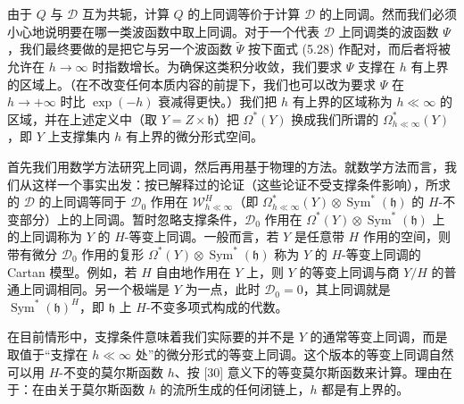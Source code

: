 \documentclass[11pt,a4paper,UTF8]{ctexart}
\theoremstyle{plain}
\theoremstyle{definition}
\begin{document}
由于 $Q$ 与 $\mathcal D$ 互为共轭，计算 $Q$ 的上同调等价于计算 $\mathcal D$ 的上同调。然而我们必须小心地说明要在哪一类波函数中取上同调。对于一个代表 $\mathcal D$ 上同调类的波函数 $\Psi$，我们最终要做的是把它与另一个波函数 $\tilde\Psi$ 按下面式 (5.28) 作配对，而后者将被允许在 $h\to\infty$ 时指数增长。为确保这类积分收敛，我们要求 $\Psi$ 支撑在 $h$ 有上界的区域上。（在不改变任何本质内容的前提下，我们也可以改为要求 $\Psi$ 在 $h\to+\infty$ 时比 $\exp(-h)$ 衰减得更快。）我们把 $h$ 有上界的区域称为 $h\ll\infty$ 的区域，并在上述定义中（取 $Y=Z\times\mathfrak h$）把 $\Omega^*(Y)$ 换成我们所谓的 $\Omega^*_{h\ll\infty}(Y)$，即 $Y$ 上支撑集内 $h$ 有上界的微分形式空间。


首先我们用数学方法研究上同调，然后再用基于物理的方法。就数学方法而言，我们从这样一个事实出发：按已解释过的论证（这些论证不受支撑条件影响），所求的 $\mathcal D$ 的上同调等同于 $\mathcal D_0$ 作用在 $\mathcal W^H_{h\ll\infty}$（即 $\Omega^*_{h\ll\infty}(Y)\otimes\operatorname{Sym}^*(\mathfrak h)$ 的 $H$-不变部分）上的上同调。暂时忽略支撑条件，$\mathcal D_0$ 作用在 $\Omega^*(Y)\otimes\operatorname{Sym}^*(\mathfrak h)$ 上的上同调称为 $Y$ 的 $H$-等变上同调。一般而言，若 $Y$ 是任意带 $H$ 作用的空间，则带有微分 $\mathcal D_0$ 作用的复形 $\Omega^*(Y)\otimes\operatorname{Sym}^*(\mathfrak h)$ 称为 $Y$ 的 $H$-等变上同调的 Cartan 模型。例如，若 $H$ 自由地作用在 $Y$ 上，则 $Y$ 的等变上同调与商 $Y/H$ 的普通上同调相同。另一个极端是 $Y$ 为一点，此时 $\mathcal D_0=0$，其上同调就是 $\operatorname{Sym}^*(\mathfrak h)^H$，即 $\mathfrak h$ 上 $H$-不变多项式构成的代数。

在目前情形中，支撑条件意味着我们实际要的并不是 $Y$ 的通常等变上同调，而是取值于“支撑在 $h\ll\infty$ 处”的微分形式的等变上同调。这个版本的等变上同调自然可以用 $H$-不变的莫尔斯函数 $h$、按 [30] 意义下的等变莫尔斯函数来计算。理由在于：在由关于莫尔斯函数 $h$ 的流所生成的任何闭链上，$h$ 都是有上界的。

\end{document}
